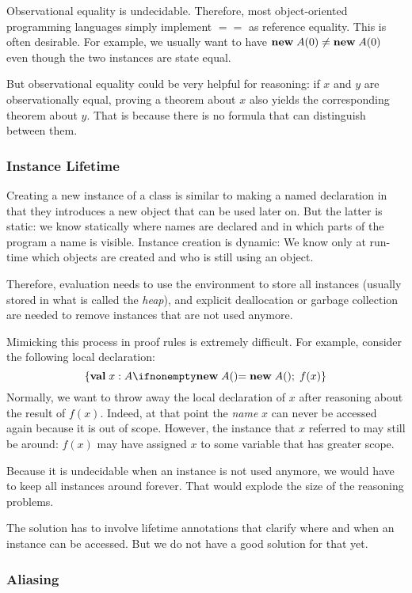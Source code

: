 Observational equality is undecidable.
Therefore, most object-oriented programming languages simply implement $==$ as reference equality.
This is often desirable.
For example, we usually want to have ${\rm \bf new}\; A(0)\neq {\rm \bf new}\; A(0)$ even though the two instances are state equal.

But observational equality could be very helpful for reasoning: if $x$ and $y$ are observationally equal, proving a theorem about $x$ also yields the corresponding theorem about $y$.
That is because there is no formula that can distinguish between them.

\subsubsection{Instance Lifetime}

Creating a new instance of a class is similar to making a named declaration in that they introduces a new object that can be used later on.
But the latter is static: we know statically where names are declared and in which parts of the program a name is visible.
Instance creation is dynamic: We know only at run-time which objects are created and who is still using an object.

Therefore, evaluation needs to use the environment to store all instances (usually stored in what is called the \emph{heap}), and explicit deallocation or garbage collection are needed to remove instances that are not used anymore.

Mimicking this process in proof rules is extremely difficult.
For example, consider the following local declaration:
\[\{\aval{x}{A}{\anew{A}{}} ;\; f(x)\}\]
Normally, we want to throw away the local declaration of $x$ after reasoning about the result of $f(x)$.
Indeed, at that point the \emph{name} $x$ can never be accessed again because it is out of scope.
However, the instance that $x$ referred to may still be around: $f(x)$ may have assigned $x$ to some variable that has greater scope.

Because it is undecidable when an instance is not used anymore, we would have to keep all instances around forever.
That would explode the size of the reasoning problems.

The solution has to involve lifetime annotations that clarify where and when an instance can be accessed.
But we do not have a good solution for that yet.

\subsubsection{Aliasing}

